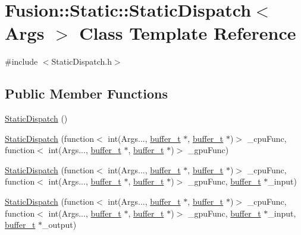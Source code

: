 \hypertarget{class_fusion_1_1_static_1_1_static_dispatch}{\section{Fusion\-:\-:Static\-:\-:Static\-Dispatch$<$ Args $>$ Class Template Reference}
\label{class_fusion_1_1_static_1_1_static_dispatch}
}


{\ttfamily \#include $<$Static\-Dispatch.\-h$>$}

\subsection*{Public Member Functions}
\begin{DoxyCompactItemize}
\item 
\hyperlink{class_fusion_1_1_static_1_1_static_dispatch_aec9bc8e9761fe734f393c2f45c38062c}{Static\-Dispatch} ()
\item 
\hyperlink{class_fusion_1_1_static_1_1_static_dispatch_a5cfebb05577106e1d07d643df71ffdae}{Static\-Dispatch} (function$<$ int(Args..., \hyperlink{structbuffer__t}{buffer\-\_\-t} $\ast$, \hyperlink{structbuffer__t}{buffer\-\_\-t} $\ast$)$>$ \-\_\-cpu\-Func, function$<$ int(Args..., \hyperlink{structbuffer__t}{buffer\-\_\-t} $\ast$, \hyperlink{structbuffer__t}{buffer\-\_\-t} $\ast$)$>$ \-\_\-gpu\-Func)
\item 
\hyperlink{class_fusion_1_1_static_1_1_static_dispatch_a3dd9cbf018bc5cb2bd79a18535c59247}{Static\-Dispatch} (function$<$ int(Args..., \hyperlink{structbuffer__t}{buffer\-\_\-t} $\ast$, \hyperlink{structbuffer__t}{buffer\-\_\-t} $\ast$)$>$ \-\_\-cpu\-Func, function$<$ int(Args..., \hyperlink{structbuffer__t}{buffer\-\_\-t} $\ast$, \hyperlink{structbuffer__t}{buffer\-\_\-t} $\ast$)$>$ \-\_\-gpu\-Func, \hyperlink{structbuffer__t}{buffer\-\_\-t} $\ast$\-\_\-input)
\item 
\hyperlink{class_fusion_1_1_static_1_1_static_dispatch_a2149402c6452471ae5652cace75b3de0}{Static\-Dispatch} (function$<$ int(Args..., \hyperlink{structbuffer__t}{buffer\-\_\-t} $\ast$, \hyperlink{structbuffer__t}{buffer\-\_\-t} $\ast$)$>$ \-\_\-cpu\-Func, function$<$ int(Args..., \hyperlink{structbuffer__t}{buffer\-\_\-t} $\ast$, \hyperlink{structbuffer__t}{buffer\-\_\-t} $\ast$)$>$ \-\_\-gpu\-Func, \hyperlink{structbuffer__t}{buffer\-\_\-t} $\ast$\-\_\-input, \hyperlink{structbuffer__t}{buffer\-\_\-t} $\ast$\-\_\-output)
\item 

\end{DoxyCompactItemize}
